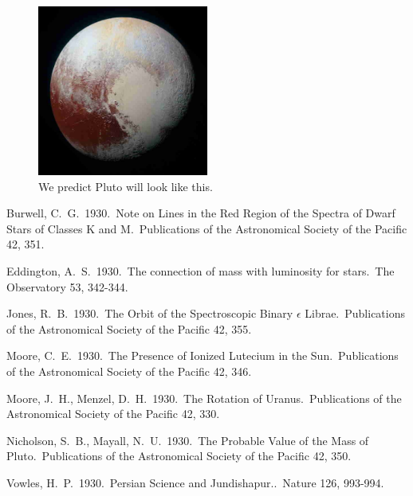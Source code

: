 \documentclass{lowell-prop}
\begin{document}
\begin{figure}[h]
  \includegraphics[width=0.5\textwidth]{pluto-small.eps} %
  \caption{We predict Pluto will look like this.}\label{fig:name}
\end{figure}



\begin{thebibliography}{99}
 Burwell, C.~G.\ 1930.\ Note on 
Lines in the Red Region of the Spectra of Dwarf Stars of Classes K and M.\ 
Publications of the Astronomical Society of the Pacific 42, 351. 

 Eddington, A.~S.\ 1930.\ The 
connection of mass with luminosity for stars.\ The Observatory 53, 342-344. 

 Jones, R.~B.\ 1930.\ The Orbit 
of the Spectroscopic Binary {$\epsilon$} Librae.\ Publications of the 
Astronomical Society of the Pacific 42, 355. 

 Moore, C.~E.\ 1930.\ The 
Presence of Ionized Lutecium in the Sun.\ Publications of the Astronomical 
Society of the Pacific 42, 346. 

 Moore, J.~H., Menzel, 
D.~H.\ 1930.\ The Rotation of Uranus.\ Publications of the Astronomical 
Society of the Pacific 42, 330. 

 Nicholson, S.~B., 
Mayall, N.~U.\ 1930.\ The Probable Value of the Mass of Pluto.\ 
Publications of the Astronomical Society of the Pacific 42, 350. 

\bibitem{1930Natur.126..993V} Vowles, H.~P.\ 1930.\ Persian 
Science and Jundishapur..\ Nature 126, 993-994. 

\end{thebibliography}
\end{document}
